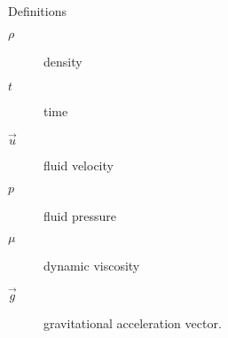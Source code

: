 \begin{frame}{Definitions}
\begin{description}
\item [$\rho$] density
\item[$t$] time
\item[$\vec u$] fluid velocity
\item[$p$] fluid pressure
\item[$\mu$] dynamic viscosity
\item[$\vec g$] gravitational acceleration vector.
\end{description}
\end{frame}